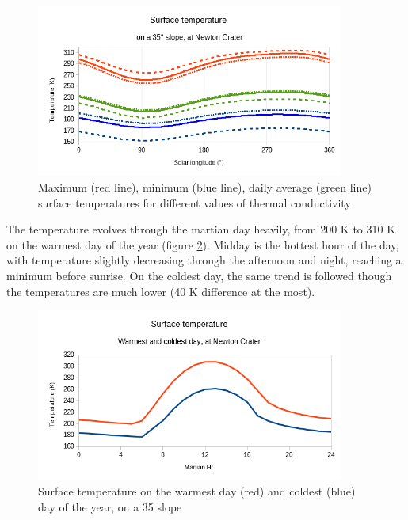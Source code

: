 \documentclass{report}
\begin{document}
\begin{figure}
    \centering
    \includegraphics[width=0.9\textwidth]{graphs/0108-newton-diffk.png}
    \caption{Maximum (red line), minimum (blue line), daily average (green line) surface temperatures for different values of thermal conductivity}
    \label{diffknewton}
\end{figure}{}

The temperature evolves through the martian day heavily, from 200 K to 310 K on the warmest day of the year (figure \ref{hourlynewton}). Midday is the hottest hour of the day, with temperature slightly decreasing through the afternoon and night, reaching a minimum before sunrise. On the coldest day, the same trend is followed though the temperatures are much lower (40 K difference at the most). \\
\begin{figure}
    \centering
    \includegraphics[width=0.9\textwidth]{graphs/0108-newton-hourly.png}
    \caption{Surface temperature on the warmest day (red) and coldest (blue) day of the year, on a 35 \degree slope}
    \label{hourlynewton}
\end{figure}{}
\end{document}
